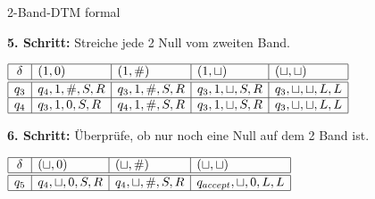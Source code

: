 \documentclass[answers]{submit}
\begin{document}
\begin{exercise}[6]{2-Band-DTM formal}
{  \vspace{1cm}

  \textbf{5. Schritt:} Streiche jede 2 Null vom zweiten Band.

  $\begin{array}{|c|l|l|l|l|l|l}
      \hline
      \delta & (1,0)        & (1,\#)       & (1, \sqcup)      & (\sqcup,\sqcup)       \\
      \hline
      \hline
      q_3    & q_4,1,\#,S,R & q_3,1,\#,S,R & q_3,1,\sqcup,S,R & q_3,\sqcup,\sqcup,L,L
      \\
      \hline
      q_4    & q_3,1,0,S,R  & q_4,1,\#,S,R & q_3,1,\sqcup,S,R & q_3,\sqcup,\sqcup,L,L \\
      \hline
    \end{array}$


  \vspace{1cm}

  \textbf{6. Schritt:} Überprüfe, ob nur noch eine Null auf dem 2 Band ist.

  $\begin{array}{|c|l|l|l|l}
      \hline
      \delta & (\sqcup,0)       & (\sqcup,\#)       & (\sqcup,\sqcup)         \\
      \hline
      \hline
      q_5    & q_4,\sqcup,0,S,R & q_4,\sqcup,\#,S,R & q_{accept},\sqcup,0,L,L
      \\
      \hline
    \end{array}$

  \vspace{1cm}



  }
\end{exercise}
\end{document}
